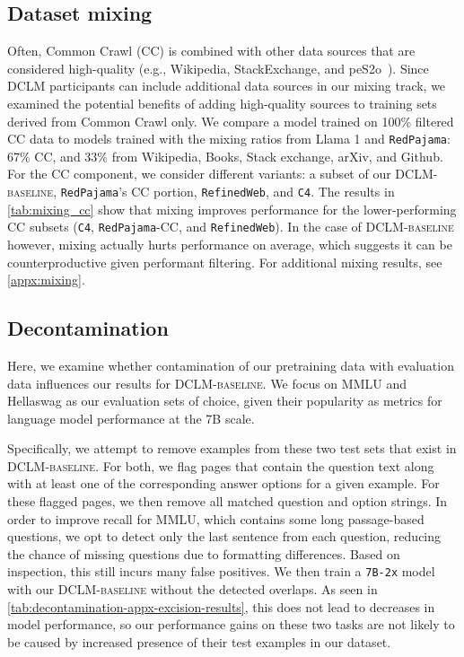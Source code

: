 \subsection{Dataset mixing}
\label{sec:mixing}
Often, Common Crawl (CC) is combined with other data sources that are considered high-quality \citep{rpj, pile, openwebtext, llama2} (e.g., Wikipedia, StackExchange, and peS2o~\citep{peS2o}). Since DCLM participants can include additional data sources in our mixing track, we examined the potential benefits of adding high-quality sources to training sets derived from Common Crawl only. We compare a model trained on 100\% filtered CC data to models trained with the mixing ratios from Llama 1 and \texttt{RedPajama}: 67\% CC, and 33\% from Wikipedia, Books, Stack exchange, arXiv, and Github. For the CC component, we consider different variants: a subset of our \textsc{DCLM-baseline}, \texttt{RedPajama}'s CC portion, \texttt{RefinedWeb}, and \texttt{C4}.
The results in \ref{tab:mixing_cc} show that mixing improves performance for the lower-performing CC subsets (\texttt{C4}, \texttt{RedPajama}-CC, and \texttt{RefinedWeb}).
In the case of \textsc{DCLM-baseline} however, mixing actually hurts performance on average, which suggests it can be counterproductive given performant filtering. For additional mixing results, see \ref{appx:mixing}.

\subsection{Decontamination}
\label{sec:decontamination}

Here, we examine whether contamination of our pretraining data with evaluation data influences our results for \textsc{DCLM-baseline}.
We focus on MMLU and Hellaswag as our evaluation sets of choice, given their popularity as metrics for language model performance at the 7B scale.

Specifically, we attempt to remove examples from these two test sets that exist in \textsc{DCLM-baseline}.
For both, we flag pages that contain the question text along with at least one of the corresponding answer options for a given example. For these flagged pages, we then remove all matched question and option strings. In order to improve recall for MMLU, which contains some long passage-based questions, we opt to detect only the last sentence from each question, reducing the chance of missing questions due to formatting differences. Based on inspection, this still incurs many false positives. We then train a \texttt{7B-2x} model with our \textsc{DCLM-baseline} without the detected overlaps. As seen in \ref{tab:decontamination-appx-excision-results}, this does not lead to decreases in model performance, so our performance gains on these two tasks are not likely to be caused by increased presence of their test examples in our dataset.

